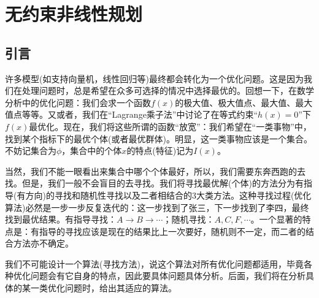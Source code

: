 % 
\chapter{无约束非线性规划}
\section{引言}
    \par
    许多模型(如支持向量机，线性回归等)最终都会转化为一个优化问题。这是因为我们在处理问题时，总是希望在众多可选择的情况中选择最优的。回想一下，在数学分析中的优化问题：我们会求一个函数$f(x)$的极大值、极大值点、最大值、最大值点等等。又或者，我们在“Lagrange乘子法”中讨论了在等式约束“$h(x)=0$”下$f(x)$最优化。现在，我们将这些所谓的函数“放宽”：我们希望在“一类事物”中，找到某个指标下的最优个体(或者最优群体)。明显，这一类事物应该是一个集合。不妨记集合为$\phi$，集合中的个体$x$的特点(特征)记为$I(x)$。
    \par
    当然，我们不能一眼看出来集合中哪个个体最好，所以，我们需要东奔西跑的去找。但是，我们一般不会盲目的去寻找。我们将寻找最优解(个体)的方法分为有指导(有方向)的寻找和随机性寻找以及二者相结合的3大类方法。这种寻找过程(优化算法)必然是一步一步反复迭代的：这一步找到了张三，下一步找到了李四，最终找到最优结果。有指导寻找：$A \rightarrow B \rightarrow \cdots$；随机寻找：$A,C,F,\cdots$。一个显著的特点是：有指导的寻找应该是现在的结果比上一次要好，随机则不一定，而二者的结合方法亦不确定。
    \par
    我们不可能设计一个算法(寻找方法)，说这个算法对所有优化问题都适用，毕竟各种优化问题会有它自身的特点，因此要具体问题具体分析。后面，我们将在分析具体的某一类优化问题时，给出其适应的算法。
